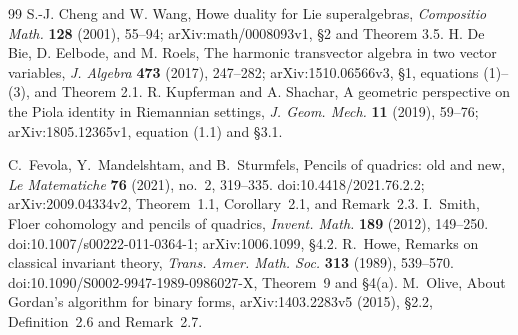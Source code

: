\begin{thebibliography}{99}
S.-J. Cheng and W. Wang, Howe duality for Lie superalgebras,
\emph{Compositio Math.} \textbf{128} (2001), 55--94;
arXiv:math/0008093v1, \S2 and Theorem 3.5.
H. De Bie, D. Eelbode, and M. Roels,
The harmonic transvector algebra in two vector variables,
\emph{J. Algebra} \textbf{473} (2017), 247--282;
arXiv:1510.06566v3, \S1, equations (1)--(3), and Theorem 2.1.
R. Kupferman and A. Shachar,
A geometric perspective on the Piola identity in Riemannian settings,
\emph{J. Geom. Mech.} \textbf{11} (2019), 59--76;
arXiv:1805.12365v1, equation (1.1) and \S3.1.

C.~Fevola, Y.~Mandelshtam, and B.~Sturmfels,
Pencils of quadrics: old and new,
\emph{Le Matematiche} \textbf{76} (2021), no.~2, 319--335.
doi:10.4418/2021.76.2.2; arXiv:2009.04334v2,
Theorem~1.1, Corollary~2.1, and Remark~2.3.
I.~Smith, Floer cohomology and pencils of quadrics,
\emph{Invent. Math.} \textbf{189} (2012), 149--250.
doi:10.1007/s00222-011-0364-1; arXiv:1006.1099, \S4.2.
R.~Howe, Remarks on classical invariant theory,
\emph{Trans. Amer. Math. Soc.} \textbf{313} (1989), 539--570.
doi:10.1090/S0002-9947-1989-0986027-X,
Theorem~9 and \S4(a).
M.~Olive, About Gordan's algorithm for binary forms,
arXiv:1403.2283v5 (2015), \S2.2,
Definition~2.6 and Remark~2.7.
\end{thebibliography}
